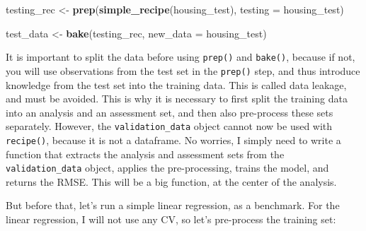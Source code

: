 \documentclass[]{gitbook}
\newenvironment{Shaded}{\begin{snugshade}}{\end{snugshade}}
\newcommand{\DataTypeTok}[1]{\textcolor[rgb]{0.13,0.29,0.53}{#1}}
\newcommand{\KeywordTok}[1]{\textcolor[rgb]{0.13,0.29,0.53}{\textbf{#1}}}
\newcommand{\NormalTok}[1]{#1}
\newcommand{\OperatorTok}[1]{\textcolor[rgb]{0.81,0.36,0.00}{\textbf{#1}}}
\newcommand{\StringTok}[1]{\textcolor[rgb]{0.31,0.60,0.02}{#1}}
\begin{document}
\begin{Shaded}
\begin{Highlighting}[]
\NormalTok{testing_rec <-}\StringTok{ }\KeywordTok{prep}\NormalTok{(}\KeywordTok{simple_recipe}\NormalTok{(housing_test), }\DataTypeTok{testing =}\NormalTok{ housing_test)}

\NormalTok{test_data <-}\StringTok{ }\KeywordTok{bake}\NormalTok{(testing_rec, }\DataTypeTok{new_data =}\NormalTok{ housing_test)}
\end{Highlighting}
\end{Shaded}

It is important to split the data before using \texttt{prep()} and \texttt{bake()}, because if not, you will
use observations from the test set in the \texttt{prep()} step, and thus introduce knowledge from the test
set into the training data. This is called data leakage, and must be avoided. This is why it is
necessary to first split the training data into an analysis and an assessment set, and then also
pre-process these sets separately. However, the \texttt{validation\_data} object cannot now be used with
\texttt{recipe()}, because it is not a dataframe. No worries, I simply need to write a function that extracts
the analysis and assessment sets from the \texttt{validation\_data} object, applies the pre-processing, trains
the model, and returns the RMSE. This will be a big function, at the center of the analysis.

But before that, let's run a simple linear regression, as a benchmark. For the linear regression, I will
not use any CV, so let's pre-process the training set:

\begin{Shaded}
\end{Shaded}
\end{document}

